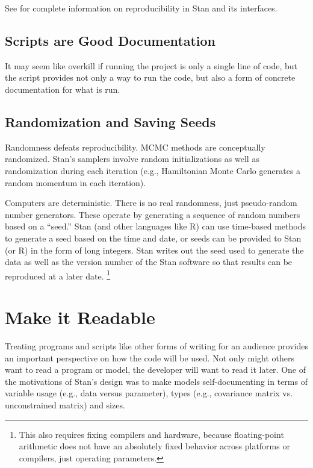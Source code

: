 See  for complete information on
reproducibility in Stan and its interfaces.

\subsection{Scripts are Good Documentation}

It may seem like overkill if running the project is only a single line
of code, but the script provides not only a way to run the code, but
also a form of concrete documentation for what is run. 


\subsection{Randomization and Saving Seeds}

Randomness defeats reproducibility.  MCMC methods are conceptually
randomized.  Stan's samplers involve random initializations as well as
randomization during each iteration (e.g., Hamiltonian Monte Carlo
generates a random momentum in each iteration).

Computers are deterministic.  There is no real randomness, just
pseudo-random number generators.  These operate by generating a
sequence of random numbers based on a ``seed.''  Stan (and other
languages like R) can use time-based methods to generate a seed based
on the time and date, or seeds can be provided to Stan (or R) in the
form of long integers.  Stan writes out the seed used to generate the
data as well as the version number of the Stan software so that
results can be reproduced at a later date.%
%
\footnote{This also requires fixing compilers and hardware, because
  floating-point arithmetic does not have an absolutely fixed behavior
  across platforms or compilers, just operating parameters.}



\section{Make it Readable}

Treating programs and scripts like other forms of writing for an
audience provides an important perspective on how the code will be
used.  Not only might others want to read a program or model, the
developer will want to read it later.  One of the motivations of
Stan's design was to make models self-documenting in terms of variable
usage (e.g., data versus parameter), types (e.g., covariance matrix
vs. unconstrained matrix) and sizes.  

